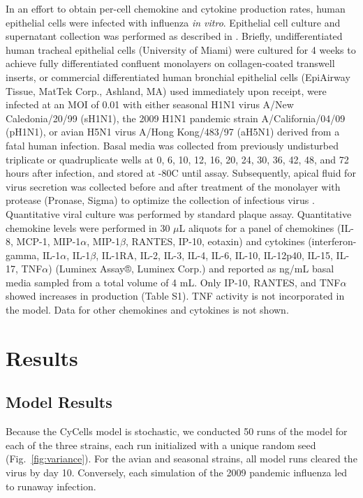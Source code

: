 \documentclass[10pt]{article}
\begin{document}
In an effort to obtain per-cell chemokine and cytokine production rates, human epithelial cells were infected with influenza \textit{in vitro}.  Epithelial cell culture and supernatant collection was performed as described in \cite{Mitchell2011}.  Briefly, undifferentiated human tracheal epithelial cells (University of Miami) were cultured for 4 weeks to achieve fully differentiated confluent monolayers on collagen-coated transwell inserts, or commercial differentiated human bronchial epithelial cells (EpiAirway Tissue, MatTek Corp., Ashland, MA) used immediately upon receipt, were infected at an MOI of 0.01 with either seasonal H1N1 virus A/New Caledonia/20/99 (sH1N1), the 2009 H1N1 pandemic strain A/California/04/09 (pH1N1), or avian H5N1 virus A/Hong Kong/483/97 (aH5N1) derived from a fatal human infection.  Basal media was collected from previously undisturbed triplicate or quadruplicate wells at 0, 6, 10, 12, 16, 20, 24, 30, 36, 42, 48, and 72 hours after infection, and stored at -80C until assay.  Subsequently, apical fluid for virus secretion was collected before and after treatment of the monolayer with protease (Pronase, Sigma) to optimize the collection of infectious virus \cite{Mitchell2011}.  Quantitative viral culture was performed by standard plaque assay.  Quantitative chemokine levels were performed in 30 $\mu$L aliquots for a panel of chemokines (IL-8, MCP-1, MIP-1$\alpha$, MIP-1$\beta$, RANTES, IP-10, eotaxin) and cytokines (interferon-gamma, IL-1$\alpha$, IL-1$\beta$, IL-1RA, IL-2, IL-3, IL-4, IL-6, IL-10, IL-12p40, IL-15, IL-17, TNF$\alpha$) (Luminex Assay®, Luminex Corp.) and reported as ng/mL basal media sampled from a total volume of 4 mL.  Only IP-10, RANTES, and TNF$\alpha$ showed increases in production (Table S1).  TNF activity is not incorporated in the model.  Data for other chemokines and cytokines is not shown.



\section*{Results}

\subsection*{Model Results}

Because the CyCells model is stochastic, we conducted 50 runs of the model for each of the three strains, each run initialized with a unique random seed (Fig.~\ref{fig:variance}).  For the avian and seasonal strains, all model runs cleared the virus by day 10.  Conversely, each simulation of the 2009 pandemic influenza led to runaway infection.
\end{document}

